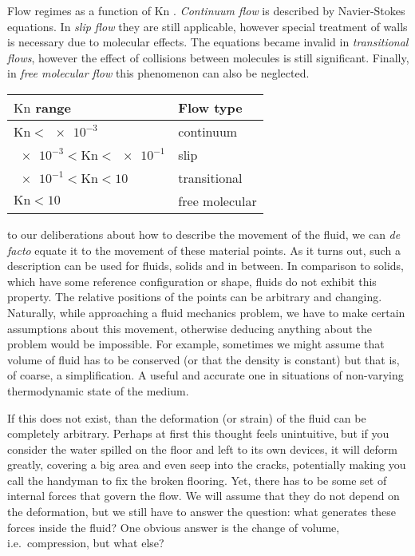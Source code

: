 \documentclass[justified, nobib]{tufte-handout}
\begin{document}
\begin{margintable}
  \caption{Flow regimes as a function of \(\mathrm{Kn}\) \citep{collin2014}.
  \emph{Continuum flow} is described by Navier-Stokes equations. In \emph{slip
  flow} they are still applicable, however special treatment of walls is
  necessary due to molecular effects. The equations became invalid in
  \emph{transitional flows}, however the effect of collisions between molecules
  is still significant. Finally, in \emph{free molecular flow} this phenomenon
  can also be neglected.}
  \label{tab:kn-regiemes}
  \centering
  \begin{tabular}{ll}
  \toprule
    \(\mathrm{Kn}\) range & Flow type \\ \midrule
    \(\mathrm{Kn} < \num{e-3}\)                 & continuum\\
    \( \num{e-3} < \mathrm{Kn} < \num{e-1}\) & slip\\
    \( \num{e-1} < \mathrm{Kn} < \num{10}\)  & transitional\\
    \( \mathrm{Kn} < \num{10}\)              & free molecular\\
  \bottomrule
  \end{tabular}
\end{margintable}

 to our deliberations about how to describe the
movement of the fluid, we can \emph{de facto} equate it to the movement of
these material points. As it turns out, such a description can be used for
fluids, solids and  in between. In comparison to solids, which have
some  reference configuration or shape, fluids do not exhibit this
property. The relative positions of the points can be arbitrary and changing.
Naturally, while approaching a fluid mechanics problem, we have to make certain
assumptions about this movement, otherwise deducing anything about the problem
would be impossible. For example, sometimes we might assume that volume of
fluid has to be conserved (or that the density is constant) but that is, of
coarse, a simplification. A useful and accurate one in situations of
non-varying thermodynamic state of the medium.

If this  does not exist, than the deformation (or strain)
of the fluid can be completely arbitrary. Perhaps at first this thought feels
unintuitive, but if you consider the water spilled on the floor and left to its
own devices, it will deform greatly, covering a big area and even seep into the
cracks, potentially making you call the handyman to fix the broken flooring.
Yet, there has to be some set of internal forces that govern the flow. We will
assume that they do not depend on the deformation, but we still have to answer
the question: what generates these forces inside the fluid? One obvious answer
is the change of volume, i.e.\ compression, but what else?
\end{document}
